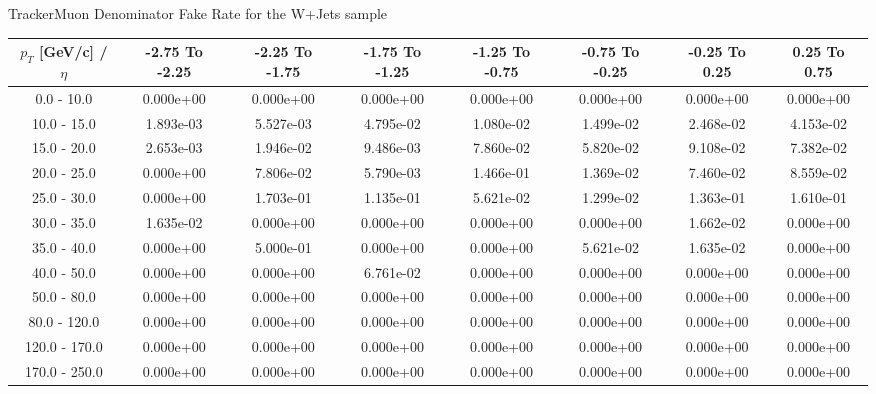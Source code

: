 \large 
TrackerMuon Denominator Fake Rate for the W+Jets sample
\footnotesize 
\begin{tabular*}{\textwidth}{|c|c|c|c|c|c|c|c|}\hline 
$p_T$ [GeV/c] / $\eta$  & -2.75 To -2.25 & -2.25 To -1.75 & -1.75 To -1.25 & -1.25 To -0.75 & -0.75 To -0.25 & -0.25 To 0.25 & 0.25 To 0.75 \\ 
 \hline 
0.0 - 10.0 & 0.000e+00 & 0.000e+00 & 0.000e+00 & 0.000e+00 & 0.000e+00 & 0.000e+00 & 0.000e+00 \\ 
10.0 - 15.0 & 1.893e-03 & 5.527e-03 & 4.795e-02 & 1.080e-02 & 1.499e-02 & 2.468e-02 & 4.153e-02 \\ 
15.0 - 20.0 & 2.653e-03 & 1.946e-02 & 9.486e-03 & 7.860e-02 & 5.820e-02 & 9.108e-02 & 7.382e-02 \\ 
20.0 - 25.0 & 0.000e+00 & 7.806e-02 & 5.790e-03 & 1.466e-01 & 1.369e-02 & 7.460e-02 & 8.559e-02 \\ 
25.0 - 30.0 & 0.000e+00 & 1.703e-01 & 1.135e-01 & 5.621e-02 & 1.299e-02 & 1.363e-01 & 1.610e-01 \\ 
30.0 - 35.0 & 1.635e-02 & 0.000e+00 & 0.000e+00 & 0.000e+00 & 0.000e+00 & 1.662e-02 & 0.000e+00 \\ 
35.0 - 40.0 & 0.000e+00 & 5.000e-01 & 0.000e+00 & 0.000e+00 & 5.621e-02 & 1.635e-02 & 0.000e+00 \\ 
40.0 - 50.0 & 0.000e+00 & 0.000e+00 & 6.761e-02 & 0.000e+00 & 0.000e+00 & 0.000e+00 & 0.000e+00 \\ 
50.0 - 80.0 & 0.000e+00 & 0.000e+00 & 0.000e+00 & 0.000e+00 & 0.000e+00 & 0.000e+00 & 0.000e+00 \\ 
80.0 - 120.0 & 0.000e+00 & 0.000e+00 & 0.000e+00 & 0.000e+00 & 0.000e+00 & 0.000e+00 & 0.000e+00 \\ 
120.0 - 170.0 & 0.000e+00 & 0.000e+00 & 0.000e+00 & 0.000e+00 & 0.000e+00 & 0.000e+00 & 0.000e+00 \\ 
170.0 - 250.0 & 0.000e+00 & 0.000e+00 & 0.000e+00 & 0.000e+00 & 0.000e+00 & 0.000e+00 & 0.000e+00 \\ 
 \hline 
\end{tabular*} 
